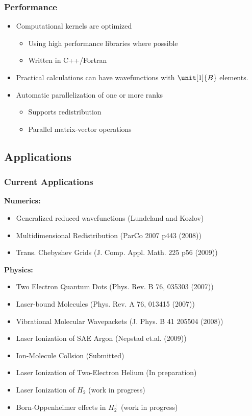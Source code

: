 \documentclass{beamer}
\begin{document}
\begin{frame}
	\frametitle{Performance}

	\begin{itemize}
		\item<1-> Computational kernels are optimized
			\begin{itemize}
				\item Using high performance libraries where possible
				\item Written in C++/Fortran 
			\end{itemize}
		\item<2-> Practical calculations can have wavefunctions with $\unit[1]{B}$ elements.
		\item<3-> Automatic parallelization of one or more ranks
			\begin{itemize}
				\item Supports redistribution
				\item Parallel matrix-vector operations
			\end{itemize}
	\end{itemize}
	
\end{frame}

\subsection{Applications}

\begin{frame}
	\frametitle{Current Applications}
	
	\textbf{Numerics:}
	\begin{itemize}
		\item Generalized reduced wavefunctions (Lundeland and Kozlov)
		\item { Multidimensional Redistribution (ParCo 2007 p443 (2008))}
		\item { Trans. Chebyshev Grids (J. Comp. Appl. Math. 225 p56 (2009))}
	\end{itemize}
	
	\textbf{Physics:}
	\begin{itemize}
		\item { Two Electron Quantum Dots (Phys. Rev. B 76, 035303 (2007))}
		\item { Laser-bound Molecules (Phys. Rev. A 76, 013415 (2007))}
		\item { Vibrational Molecular Wavepackets (J. Phys. B 41 205504 (2008))}
		\item Laser Ionization of SAE Argon (Nepstad et.al. (2009))
		\item {\color<2->{uibgreen} Ion-Molecule Collsion (Submitted)}
		\item {Laser Ionization of Two-Electron Helium (In preparation)}
		\item Laser Ionization of $H_2$ (work in progress)
		\item Born-Oppenheimer effects in $H_2^+$ (work in progress)
	\end{itemize}

\end{frame}
\end{document}
